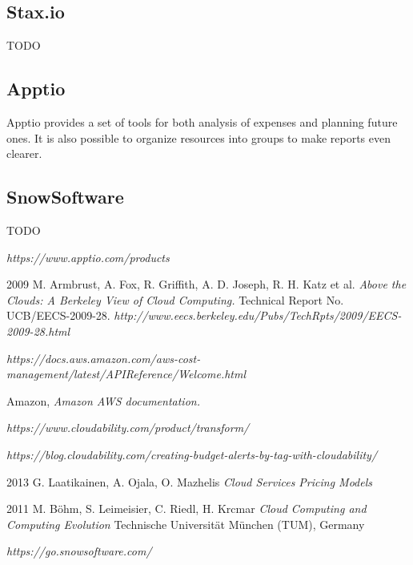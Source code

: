\documentclass[licencjacka,en]{thesisclass}
\begin{document}
	\subsection{Stax.io}

	TODO

	\subsection{Apptio}

	Apptio provides a set of tools for both analysis of expenses and planning future ones. It
	is also possible to organize resources into groups to make reports even clearer.

	\subsection{SnowSoftware}

	TODO


    
\begin{thebibliography}{99}

    \textit{https://www.apptio.com/products}

    2009 M. Armbrust, A. Fox, R. Griffith, A. D. Joseph, R. H. Katz et al.
    \textit{Above the Clouds: A Berkeley View of Cloud Computing.} 
    Technical Report No. UCB/EECS-2009-28.
    \textit{http://www.eecs.berkeley.edu/Pubs/TechRpts/2009/EECS-2009-28.html}

    \textit{https://docs.aws.amazon.com/aws-cost-management/latest/APIReference/Welcome.html}

    Amazon,
    \textit{Amazon AWS documentation.} 

    \textit{https://www.cloudability.com/product/transform/}

    \textit{https://blog.cloudability.com/creating-budget-alerts-by-tag-with-cloudability/}
        
    2013 G. Laatikainen, A. Ojala, O. Mazhelis
    \textit{Cloud Services Pricing Models}

    2011 M. Böhm, S. Leimeisier, C. Riedl, H. Krcmar
    \textit{Cloud Computing and Computing Evolution}
    Technische Universität München (TUM), Germany

    \textit{https://go.snowsoftware.com/}

\end{thebibliography}
\end{document}
